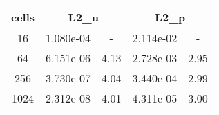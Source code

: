 \documentclass[10pt]{report}
\begin{document}
\begin{table}[H]
\begin{center}
\begin{tabular}{|c|c|c|c|c|} \hline
cells & 
\multicolumn{2}{|c|}{L2_u} & 
\multicolumn{2}{|c|}{L2_p}\\ \hline
16 & 1.080e-04 & - & 2.114e-02 & -\\ \hline
64 & 6.151e-06 & 4.13 & 2.728e-03 & 2.95\\ \hline
256 & 3.730e-07 & 4.04 & 3.440e-04 & 2.99\\ \hline
1024 & 2.312e-08 & 4.01 & 4.311e-05 & 3.00\\ \hline
\end{tabular}
\end{center}
\end{table}
\end{document}
